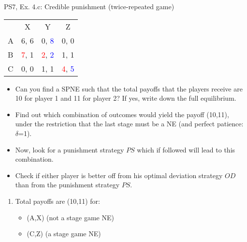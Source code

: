 \begin{frame}{PS7, Ex. 4.c: Credible punishment (twice-repeated game)}
    \vspace{-2pt}
    \begin{table}
      \begin{tabular}{l|c|c|c|}
        \multicolumn{1}{c}{} & \multicolumn{1}{c}{X} & \multicolumn{1}{c}{Y} & \multicolumn{1}{c}{Z}\\\cline{2-4}
        A   & 6, 6 &  0, \textcolor{blue}{8} &  0, 0  \\\cline{2-4}
        B & \textcolor{red}{7}, 1  & \textcolor{red}{2}, \textcolor{blue}{2} &  1, 1  \\\cline{2-4}
        C & 0, 0  & 1, 1 &  \textcolor{red}{4}, \textcolor{blue}{5}  \\\cline{2-4}
      \end{tabular}
    \end{table}
    \vspace{-4pt}
    \begin{itemize}
        \item[(c)] Can you find a SPNE such that the total payoffs that the players receive are 10 for player 1 and 11 for player 2? If yes, write down the full equilibrium.
    \end{itemize}
    \vspace{-8pt}
    \begin{multicols}{2}
      \begin{itemize}
        \item[(Step a)] Find out which combination of outcomes would yield the payoff (10,11), under the restriction that the last stage must be a NE (and perfect patience: $\delta$=1).
        \item[(Step b)] Now, look for a punishment strategy $PS$ which if followed will lead to this combination.
        \item[(Step c)] Check if either player is better off from his optimal deviation strategy $OD$ than from the punishment strategy $PS$.
      \end{itemize}
      \vfill\null\columnbreak
      \begin{enumerate}
        \item[a.] Total payoffs are (10,11) for:
        \begin{itemize}\normalsize
          \item[t=1:] (A,X) (not a stage game NE)
          \item[t=2:] (C,Z) (a stage game NE)
        \end{itemize}

\end{enumerate}
\end{multicols}
\end{frame}
